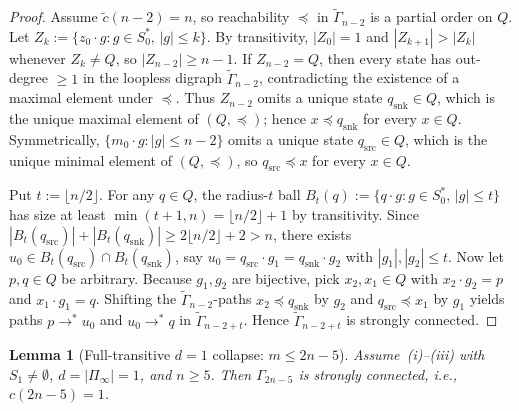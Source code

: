 \documentclass[11pt,a4paper]{article}
\newtheorem{lemma}[theorem]{Lemma}
\theoremstyle{definition}
\theoremstyle{remark}
\begin{document}
\begin{proof}
Assume $\widetilde{c}(n - 2) = n$, so reachability $\preceq$ in $\widetilde{\Gamma}_{n-2}$ is a partial order on $Q$. Let $Z_k := \{z_0 \cdot g : g \in S_0^*,\, |g| \le k\}$. By transitivity, $|Z_0| = 1$ and $|Z_{k+1}| > |Z_k|$ whenever $Z_k \neq Q$, so $|Z_{n - 2}| \ge n - 1$. If $Z_{n - 2} = Q$, then every state has out-degree $\ge 1$ in the loopless digraph $\widetilde{\Gamma}_{n - 2}$, contradicting the existence of a maximal element under $\preceq$. Thus $Z_{n - 2}$ omits a unique state $q_{\mathrm{snk}} \in Q$, which is the unique maximal element of $(Q, \preceq)$; hence $x \preceq q_{\mathrm{snk}}$ for every $x \in Q$. Symmetrically, $\{m_0 \cdot g : |g| \le n - 2\}$ omits a unique state $q_{\mathrm{src}} \in Q$, which is the unique minimal element of $(Q, \preceq)$, so $q_{\mathrm{src}} \preceq x$ for every $x \in Q$.

Put $t := \lfloor n / 2 \rfloor$. For any $q \in Q$, the radius-$t$ ball $B_t(q) := \{q \cdot g : g \in S_0^*,\, |g| \le t\}$ has size at least $\min(t + 1, n) = \lfloor n / 2 \rfloor + 1$ by transitivity. Since $|B_t(q_{\mathrm{src}})| + |B_t(q_{\mathrm{snk}})| \ge 2\lfloor n / 2 \rfloor + 2 > n$, there exists $u_0 \in B_t(q_{\mathrm{src}}) \cap B_t(q_{\mathrm{snk}})$, say $u_0 = q_{\mathrm{src}} \cdot g_1 = q_{\mathrm{snk}} \cdot g_2$ with $|g_1|, |g_2| \le t$. Now let $p, q \in Q$ be arbitrary. Because $g_1, g_2$ are bijective, pick $x_2, x_1 \in Q$ with $x_2 \cdot g_2 = p$ and $x_1 \cdot g_1 = q$. Shifting the $\widetilde{\Gamma}_{n - 2}$-paths $x_2 \preceq q_{\mathrm{snk}}$ by $g_2$ and $q_{\mathrm{src}} \preceq x_1$ by $g_1$ yields paths $p \to^* u_0$ and $u_0 \to^* q$ in $\widetilde{\Gamma}_{n - 2 + t}$. Hence $\widetilde{\Gamma}_{n - 2 + t}$ is strongly connected.
\end{proof}

\begin{lemma}[Full-transitive $d = 1$ collapse: $m \le 2n - 5$]\label{lem:d1-bound}
Assume~\textup{(i)--(iii)} with $S_1 \neq \emptyset$, $d = |\Pi_\infty| = 1$, and $n \ge 5$. Then $\Gamma_{2n - 5}$ is strongly connected, i.e., $c(2n - 5) = 1$.
\end{lemma}
\end{document}
